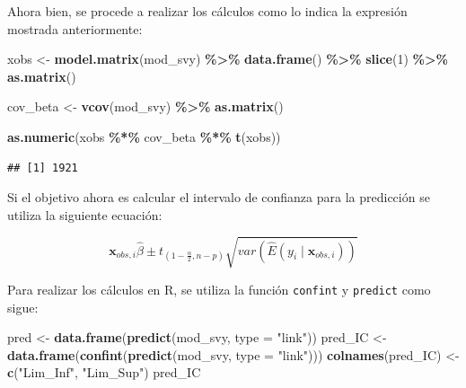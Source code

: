 \documentclass[
  spanish,
  12pt,
]{book}
\newenvironment{Shaded}{\begin{snugshade}}{\end{snugshade}}
\newcommand{\AttributeTok}[1]{\textcolor[rgb]{0.13,0.29,0.53}{#1}}
\newcommand{\DecValTok}[1]{\textcolor[rgb]{0.00,0.00,0.81}{#1}}
\newcommand{\FunctionTok}[1]{\textcolor[rgb]{0.13,0.29,0.53}{\textbf{#1}}}
\newcommand{\NormalTok}[1]{#1}
\newcommand{\OtherTok}[1]{\textcolor[rgb]{0.56,0.35,0.01}{#1}}
\newcommand{\SpecialCharTok}[1]{\textcolor[rgb]{0.81,0.36,0.00}{\textbf{#1}}}
\newcommand{\StringTok}[1]{\textcolor[rgb]{0.31,0.60,0.02}{#1}}
\begin{document}
Ahora bien, se procede a realizar los cálculos como lo indica la expresión mostrada anteriormente:

\begin{Shaded}
\begin{Highlighting}[]
\NormalTok{xobs }\OtherTok{\textless{}{-}} \FunctionTok{model.matrix}\NormalTok{(mod\_svy) }\SpecialCharTok{\%\textgreater{}\%}
        \FunctionTok{data.frame}\NormalTok{() }\SpecialCharTok{\%\textgreater{}\%} \FunctionTok{slice}\NormalTok{(}\DecValTok{1}\NormalTok{) }\SpecialCharTok{\%\textgreater{}\%} \FunctionTok{as.matrix}\NormalTok{()}

\NormalTok{cov\_beta }\OtherTok{\textless{}{-}} \FunctionTok{vcov}\NormalTok{(mod\_svy) }\SpecialCharTok{\%\textgreater{}\%} \FunctionTok{as.matrix}\NormalTok{()}

\FunctionTok{as.numeric}\NormalTok{(xobs }\SpecialCharTok{\%*\%}\NormalTok{ cov\_beta }\SpecialCharTok{\%*\%} \FunctionTok{t}\NormalTok{(xobs))}
\end{Highlighting}
\end{Shaded}

\begin{verbatim}
## [1] 1921
\end{verbatim}

Si el objetivo ahora es calcular el intervalo de confianza para la predicción se utiliza la siguiente ecuación:

\[
\boldsymbol{x}_{obs,i}\hat{\beta}\pm t_{\left(1-\frac{\alpha}{2},n-p\right)}\sqrt{var\left(\hat{E}\left(y_{i}\mid\boldsymbol{x}_{obs,i}\right)\right)}
\]

Para realizar los cálculos en R, se utiliza la función \texttt{confint} y \texttt{predict} como sigue:

\begin{Shaded}
\begin{Highlighting}[]
\NormalTok{pred }\OtherTok{\textless{}{-}} \FunctionTok{data.frame}\NormalTok{(}\FunctionTok{predict}\NormalTok{(mod\_svy, }\AttributeTok{type =} \StringTok{"link"}\NormalTok{))}
\NormalTok{pred\_IC }\OtherTok{\textless{}{-}} \FunctionTok{data.frame}\NormalTok{(}\FunctionTok{confint}\NormalTok{(}\FunctionTok{predict}\NormalTok{(mod\_svy, }\AttributeTok{type =} \StringTok{"link"}\NormalTok{)))}
\FunctionTok{colnames}\NormalTok{(pred\_IC) }\OtherTok{\textless{}{-}} \FunctionTok{c}\NormalTok{(}\StringTok{"Lim\_Inf"}\NormalTok{, }\StringTok{"Lim\_Sup"}\NormalTok{)}
\NormalTok{pred\_IC}
\end{Highlighting}
\end{Shaded}
\end{document}
